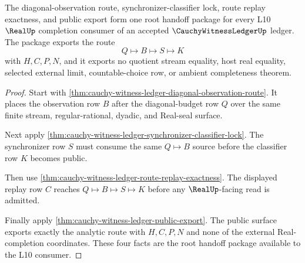 \begin{theorem}
\label{thm:cauchy-witness-ledger-root-completion-package}
The diagonal-observation route, synchronizer-classifier lock, route replay
exactness, and public export form one root handoff package for every L10
$\RealUp$ completion consumer of an accepted $\CauchyWitnessLedgerUp$ ledger.
The package exports the route
$$
Q \longmapsto B \longmapsto S \longmapsto K
$$
with $H,C,P,N$, and it exports no quotient stream equality, host real equality,
selected external limit, countable-choice row, or ambient completeness theorem.
\end{theorem}
\begin{proof}
Start with \autoref{thm:cauchy-witness-ledger-diagonal-observation-route}. It
places the observation row $B$ after the diagonal-budget row $Q$ over the same
finite stream, regular-rational, dyadic, and Real-seal surface.

Next apply \autoref{thm:cauchy-witness-ledger-synchronizer-classifier-lock}.
The synchronizer row $S$ must consume the same $Q \longmapsto B$ source before
the classifier row $K$ becomes public.

Then use \autoref{thm:cauchy-witness-ledger-route-replay-exactness}. The
displayed replay row $C$ reaches $Q \longmapsto B \longmapsto S \longmapsto K$
before any $\RealUp$-facing read is admitted.

Finally apply \autoref{thm:cauchy-witness-ledger-public-export}. The public
surface exports exactly the analytic route with $H,C,P,N$ and none of the
external Real-completion coordinates. These four facts are the root handoff
package available to the L10 consumer.
\end{proof}

